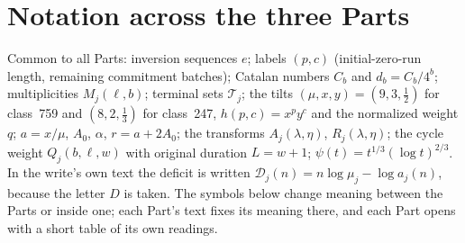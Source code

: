 \documentclass[11pt,letterpaper]{article}
\theoremstyle{remark}\newtheorem{remark}[theorem]{Remark}
\numberwithin{equation}{section}
\newcommand{\Dfc}{\mathcal D}
\begin{document}
\section*{Notation across the three Parts}\label{ivd:sec:notation}
Common to all Parts: inversion sequences $e$; labels $(p,c)$ (initial-zero-run length, remaining commitment batches); Catalan numbers $C_b$ and $d_b=C_b/4^b$; multiplicities $M_j(\ell,b)$; terminal sets $\mathcal T_j$; the tilts $(\mu,x,y)=(9,3,\frac12)$ for class~759 and $(8,2,\frac13)$ for class~247, $h(p,c)=x^py^c$ and the normalized weight $q$; $a=x/\mu$, $A_0$, $\alpha$, $r=a+2A_0$; the transforms $A_j(\lambda,\eta)$, $R_j(\lambda,\eta)$; the cycle weight $Q_j(b,\ell,w)$ with original duration $L=w+1$; $\psi(t)=t^{1/3}(\log t)^{2/3}$. In the write's own text the deficit is written $\Dfc_j(n)=n\log\mu_j-\log a_j(n)$, because the letter $D$ is taken. The symbols below change meaning between the Parts or inside one; each Part's text fixes its meaning there, and each Part opens with a short table of its own readings.
\begingroup\small
\end{document}
